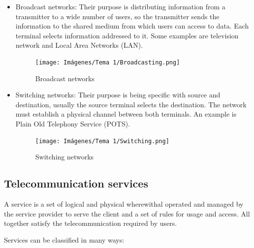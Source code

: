 \documentclass[
	12pt,
	twoside
]{book}
\begin{document}
\begin{itemize}
	\item {
		Broadcast networks: Their purpose is distributing information from a transmitter to a wide number of users, so the transmitter sends the information to the shared medium from which users can access to data. Each terminal selects information addressed to it. Some examples are television network and Local Area Networks (LAN).

		\begin{figure}[H]
			\centering
			\texttt{[image: Imágenes/Tema 1/Broadcasting.png]}
			\caption{
				\label{fig:unit1_broadcast}
				Broadcast networks
			}
		\end{figure}
	}
	\item {
		Switching networks: Their purpose is being specific with source and destination, usually the source terminal selects the destination. The network must establish a physical channel between both terminals. An example is Plain Old Telephony Service (POTS).

		\begin{figure}[H]
			\centering
			\texttt{[image: Imágenes/Tema 1/Switching.png]}
			\caption{
				\label{fig:unit1_switching}
				Switching networks
			}
		\end{figure}
	}
\end{itemize}

\subsection{Telecommunication services}

A service is a set of logical and physical wherewithal operated and managed by the service provider to serve the client and a set of rules for usage and access. All together satisfy the telecommunication required by users.

Services can be classified in many ways:
\end{document}
